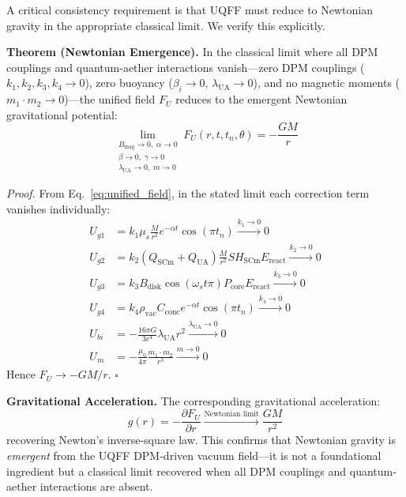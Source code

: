 \documentclass[12pt,a4paper]{article}
\begin{document}
A critical consistency requirement is that UQFF must reduce to Newtonian gravity in the appropriate classical limit. We verify this explicitly.

\textbf{Theorem (Newtonian Emergence).} In the classical limit where all DPM couplings and quantum-aether interactions vanish---zero DPM couplings ($k_1, k_2, k_3, k_4 \to 0$), zero buoyancy ($\beta_i \to 0$, $\lambda_{\mathrm{UA}} \to 0$), and no magnetic moments ($m_1 \cdot m_2 \to 0$)---the unified field $F_U$ reduces to the emergent Newtonian gravitational potential:
\begin{equation}
\lim_{\substack{B_{\text{mag}} \to 0,\; \alpha \to 0 \\ \beta \to 0,\; \gamma \to 0 \\ \lambda_{\text{UA}} \to 0,\; m \to 0}} F_U(r, t, t_n, \theta) = -\frac{G M}{r}
\label{eq:newtonian_limit}
\end{equation}

\textit{Proof.} From Eq.~\eqref{eq:unified_field}, in the stated limit each correction term vanishes individually:
\begin{align}
U_{g1} &= k_1 \mu_s \tfrac{M}{r^2} e^{-\alpha t} \cos(\pi t_n) \xrightarrow{k_1 \to 0} 0 \label{eq:lim1} \\
U_{g2} &= k_2 (Q_{\mathrm{SCm}}+Q_{\mathrm{UA}}) \tfrac{M}{r^2} S H_{\mathrm{SCm}} E_{\mathrm{react}} \xrightarrow{k_2 \to 0} 0 \label{eq:lim2} \\
U_{g3} &= k_3 B_{\mathrm{disk}} \cos(\omega_s t \pi) P_{\mathrm{core}} E_{\mathrm{react}} \xrightarrow{k_3 \to 0} 0 \label{eq:lim3} \\
U_{g4} &= k_4 \rho_{\mathrm{vac}} C_{\mathrm{conc}} e^{-\alpha t} \cos(\pi t_n) \xrightarrow{k_4 \to 0} 0 \label{eq:lim4} \\
U_{bi} &= -\frac{16\pi G}{3 c^4} \lambda_{\text{UA}} r^2 \xrightarrow{\lambda_{\text{UA}} \to 0} 0 \label{eq:lim5} \\
U_m &= -\frac{\mu_0}{4\pi} \frac{m_1 \cdot m_2}{r^3} \xrightarrow{m \to 0} 0 \label{eq:lim6}
\end{align}
Hence $F_U \to -GM/r$. \hfill $\square$

\textbf{Gravitational Acceleration.} The corresponding gravitational acceleration:
\begin{equation}
g(r) = -\frac{\partial F_U}{\partial r} \xrightarrow{\text{Newtonian limit}} \frac{G M}{r^2}
\label{eq:newtonian_accel}
\end{equation}
recovering Newton's inverse-square law. This confirms that Newtonian gravity is \textit{emergent} from the UQFF DPM-driven vacuum field---it is not a foundational ingredient but a classical limit recovered when all DPM couplings and quantum-aether interactions are absent.
\end{document}
